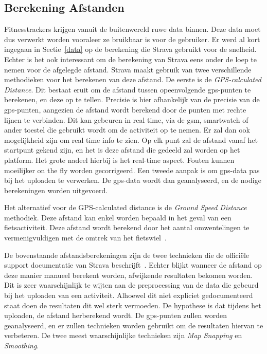 \subsection{Berekening Afstanden}
Fitnesstrackers krijgen vanuit de buitenwereld ruwe data binnen. Deze data moet
dus verwerkt worden vooraleer ze bruikbaar is voor de gebruiker. Er werd al
kort ingegaan in Sectie~\ref{data} op de berekening die Strava gebruikt voor de
snelheid. Echter is het ook interessant om de berekening van Strava eens onder
de loep te nemen voor de afgelegde afstand. Strava maakt gebruik van twee
verschillende methodieken voor het berekenen van deze afstand. De eerste is de
\textit{GPS-calculated Distance}. Dit bestaat eruit om de afstand tussen
opeenvolgende \ac{gps}-punten te berekenen, en deze op te tellen. Precisie is
hier afhankelijk van de precisie van de \ac{gps}-punten, aangezien de afstand
wordt berekend door de punten met rechte lijnen te verbinden. Dit kan gebeuren
in real time, via de gsm, smartwatch of ander toestel die gebruikt wordt om de
activiteit op te nemen. Er zal dan ook mogelijkheid zijn om real time info te
zien. Op elk punt zal de afstand vanaf het startpunt gekend zijn, en het is
deze afstand die gedeeld zal worden op het platform. Het grote nadeel hierbij
is het real-time aspect. Fouten kunnen moeilijker on the fly worden
gecorrigeerd. Een tweede aanpak is om \ac{gps}-data pas bij het uploaden te
verwerken. De \ac{gps}-data wordt dan geanalyseerd, en de nodige berekeningen
worden uitgevoerd.

Het alternatief voor de GPS-calculated distance is de \textit{Ground Speed
    Distance} methodiek. Deze afstand kan enkel worden bepaald in het geval van een
fietsactiviteit. Deze afstand wordt berekend door het aantal omwentelingen te
vermenigvuldigen met de omtrek van het fietswiel~\cite{HowDista47:online}.

De bovenstaande afstandsberekeningen zijn de twee technieken die de officiële
support documentatie van Strava beschrijft~\cite{HowDista47:online}. Echter
blijkt wanneer de afstand op deze manier manueel berekent worden, afwijkende
resultaten bekomen worden. Dit is zeer waarschijnlijk te wijten aan de
preprocessing van de data die gebeurd bij het uploaden van een activiteit.
Alhoewel dit niet expliciet gedocumenteerd staat doen de resultaten dit wel
sterk vermoeden. De hypothese is dat tijdens het uploaden, de afstand
herberekend wordt. De \ac{gps}-punten zullen worden geanalyseerd, en er zullen
technieken worden gebruikt om de resultaten hiervan te verbeteren. De twee
meest waarschijnlijke technieken zijn \textit{Map Snapping} en
\textit{Smoothing}.

